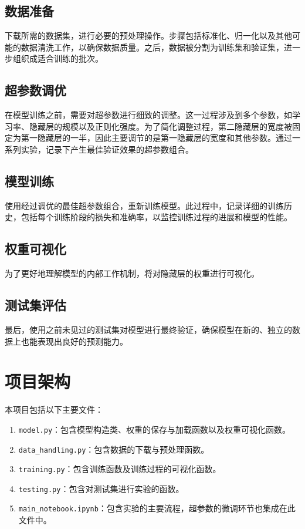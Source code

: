 \documentclass[a4paper,12pt]{article}
\begin{document}
\subsection{数据准备}
下载所需的数据集，进行必要的预处理操作。步骤包括标准化、归一化以及其他可能的数据清洗工作，以确保数据质量。之后，数据被分割为训练集和验证集，进一步组织成适合训练的批次。

\subsection{超参数调优}
在模型训练之前，需要对超参数进行细致的调整。这一过程涉及到多个参数，如学习率、隐藏层的规模以及正则化强度。为了简化调整过程，第二隐藏层的宽度被固定为第一隐藏层的一半，因此主要调节的是第一隐藏层的宽度和其他参数。通过一系列实验，记录下产生最佳验证效果的超参数组合。

\subsection{模型训练}
使用经过调优的最佳超参数组合，重新训练模型。此过程中，记录详细的训练历史，包括每个训练阶段的损失和准确率，以监控训练过程的进展和模型的性能。

\subsection{权重可视化}
为了更好地理解模型的内部工作机制，将对隐藏层的权重进行可视化。

\subsection{测试集评估}
最后，使用之前未见过的测试集对模型进行最终验证，确保模型在新的、独立的数据上也能表现出良好的预测能力。


\section{项目架构}
本项目包括以下主要文件：
\begin{enumerate}
    \item \texttt{model.py}：包含模型构造类、权重的保存与加载函数以及权重可视化函数。
    \item \texttt{data\_handling.py}：包含数据的下载与预处理函数。
    \item \texttt{training.py}：包含训练函数及训练过程的可视化函数。
    \item \texttt{testing.py}：包含对测试集进行实验的函数。
    \item \texttt{main\_notebook.ipynb}：包含实验的主要流程，超参数的微调环节也集成在此文件中。
\end{enumerate}
\end{document}
